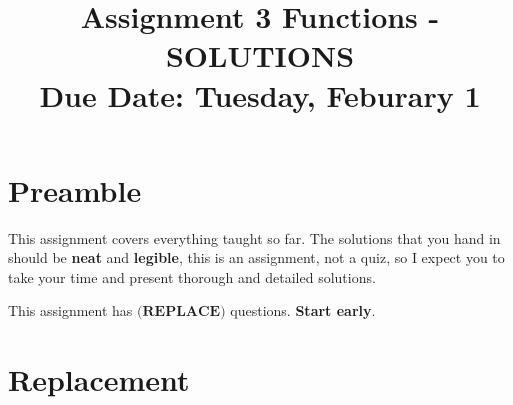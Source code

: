 \documentclass[12pt]{article} %
\title{\textbf{Assignment 3 Functions - SOLUTIONS} \\ \textbf{Due Date: } Tuesday, Feburary 1}
\date{}
\begin{document}
	\renewcommand*{\coursecode}{MATH 235} %
	\renewcommand*{\assgnnumber}{Assignment 1} %
	\renewcommand*{\submdate}{September 14, 2021} %
	\renewcommand*{\studentfname}{Abdullah} %
	\renewcommand*{\studentlname}{Zubair} %
    \renewcommand*{\proofname}{Proof:}

	\renewcommand\qedsymbol{$\blacksquare$}
	\setfigpath
	\fancyhfoffset[L,O]{0pt} %



\maketitle
	\section{Preamble}
  This assignment covers everything taught so far. The solutions that you hand in should be \textbf{neat} and \textbf{legible},
  this is an assignment, not a quiz, so I expect you to take your time and present thorough and detailed solutions.

  This assignment has $\textbf{(REPLACE)}$ questions. \textbf{Start early}.
  \section{Replacement} 
\end{document}

